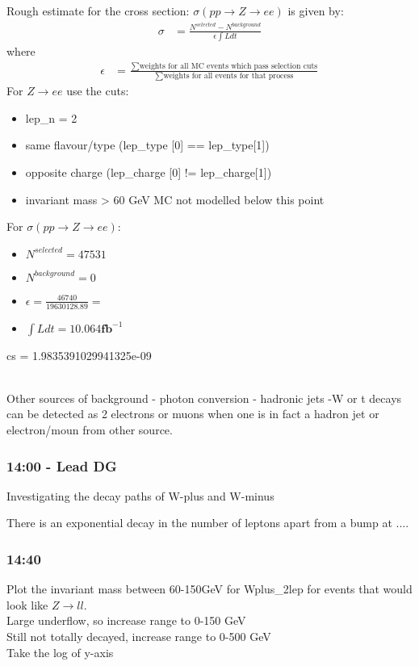 Rough estimate for the cross section: $\sigma (pp \rightarrow Z \rightarrow ee)$ is given by:
\begin{align}
    \sigma &= \frac{N^{selected} - N^{background}}{\epsilon \int L dt}
\end{align}
where
\begin{align}
    \epsilon &= \frac{\sum \text{weights for all MC events which pass selection cuts}}{\sum \text{weights for all events for that process}}
\end{align}
For $Z \rightarrow ee$ use the cuts:
\begin{itemize}
    \item lep\_n = 2
    \item same flavour/type (lep\_type [0] == lep\_type[1])
    \item opposite charge (lep\_charge [0] != lep\_charge[1])
    \item invariant mass > 60 GeV
    \subitem MC not modelled below this point
\end{itemize}
For $\sigma (pp \rightarrow Z \rightarrow ee)$:
\begin{itemize}
    \item $N^{selected} = 47531$
    \item $N^{background} = 0$
    \item $\epsilon = \frac{46740}{19630128.89} = $
    \item $\int L dt = 10.064 \textbf{fb}^{-1}$
\end{itemize}


cs = 1.9835391029941325e-09

\\
Other sources of background
- photon conversion
- hadronic jets
-W or t decays can be detected as 2 electrons or muons when one is in fact a hadron jet or electron/moun from other source.

\subsubsection*{14:00 - Lead DG}
Investigating the decay paths of W-plus and W-minus

There is an exponential decay in the number of leptons apart from a bump at ....


\subsubsection*{14:40}
Plot the invariant mass between 60-150GeV for Wplus\_2lep for events that would look like $Z \rightarrow ll$.
\\
Large underflow, so increase range to 0-150 GeV
\\
Still not totally decayed, increase range to 0-500 GeV
\\
Take the log of y-axis

